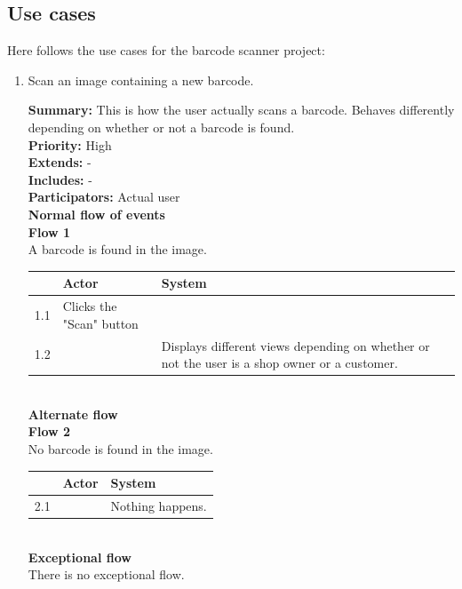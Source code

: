 \documentclass{report}
\begin{document}
\pagebreak



\subsection{Use cases}
Here follows the use cases for the barcode scanner project: 

\begin{enumerate}

  \item Scan an image containing a new barcode. \

    \textbf{Summary:} This is how the user actually scans a barcode. Behaves differently depending on whether or not a barcode is found. \\
    \textbf{Priority:} High \\
    \textbf{Extends:} - \\
    \textbf{Includes:} - \\
    \textbf{Participators:} Actual user \\
    \textbf{Normal flow of events} \\
    \textbf{Flow 1} \\ A barcode is found in the image. \\

    \begin{tabular}{ | l | p{4cm} | p{4cm} |}
    \hline
      & Actor & System \\ \hline
    1.1 & Clicks the "Scan" button & \\ \hline
    1.2 & & Displays different views depending on whether or not the user is a shop owner or a customer. \\
    \hline
    \end{tabular} \\

    \textbf{Alternate flow} \\
    \textbf{Flow 2} \\ No barcode is found in the image. \\

    \begin{tabular}{ | l | p{4cm} | p{4cm} |}
    \hline
      & Actor & System \\ \hline
    2.1 & & Nothing happens. \\
    \hline
    \end{tabular} \\

    \textbf{Exceptional flow} \\ There is no exceptional flow.


\end{enumerate}
\end{document}
